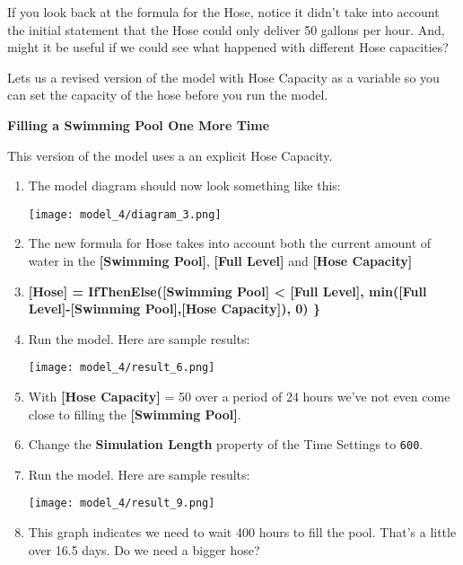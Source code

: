 \documentclass[]{memoir}
\makeatletter
\def\maxwidth{\ifdim\Gin@nat@width>\linewidth\linewidth
\else\Gin@nat@width\fi}
\let\Oldincludegraphics\includegraphics
\renewcommand{\includegraphics}[1]{\Oldincludegraphics[width=\maxwidth]{#1}}
\newcommand{\p}[1]{\textbf{{[}#1{]}}}
\newcommand{\e}[1]{\texttt{#1}}
\renewcommand{\a}[1]{\textbf{#1}}
\makeatother
\begin{document}
If you look back at the formula for the Hose, notice it didn't take into
account the initial statement that the Hose could only deliver 50
gallons per hour. And, might it be useful if we could see what happened
with different Hose capacities?

Lets us a revised version of the model with Hose Capacity as a variable
so you can set the capacity of the hose before you run the model.

\FloatBarrier 

\begin{oframed}\textbf{Filling a Swimming Pool One More Time} 

 This version of the model uses a an explicit Hose Capacity.

\begin{enumerate}
\item The model diagram should now look something like this: \par \begin{minipage}{\linewidth}  \centering \texttt{[image: model\_4/diagram\_3.png]}
\end{minipage}
\item 

The new formula for Hose takes into account both the current amount of water in the \p{Swimming Pool}, \p{Full Level} and \p{Hose Capacity}


\item 

\textbf{\p{Hose} = IfThenElse(\p{Swimming Pool} < \p{Full Level}, min(\p{Full Level}-\p{Swimming Pool},\p{Hose Capacity}), 0) \}}


\item Run the model. Here are sample results:\par \begin{minipage}{\linewidth}  \centering \texttt{[image: model\_4/result\_6.png]}
\end{minipage}
\item 

With \p{Hose Capacity} = 50 over a period of 24 hours we've not even come close to filling the \p{Swimming Pool}.


\item  Change the \a{Simulation Length} property of the Time Settings to \e{600}.
\item Run the model. Here are sample results:\par \begin{minipage}{\linewidth}  \centering \texttt{[image: model\_4/result\_9.png]}
\end{minipage}
\item 

This graph indicates we need to wait 400 hours to fill the pool. That's a little over 16.5 days. Do we need a bigger hose?



\end{enumerate} \end{oframed}
\end{document}
